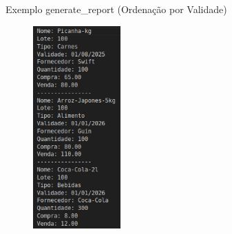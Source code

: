 \documentclass{beamer}
\begin{document}
\begin{frame}{Exemplo generate\_report (Ordenação por Validade)}
    \begin{figure}
        \centering
        \includegraphics[width=0.3\textwidth]{img/relatorio-validade.png}
    \end{figure}
\end{frame}

\begin{frame}[plain]
\end{frame}
\end{document}
